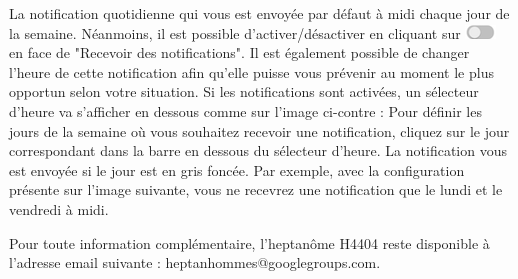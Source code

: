 La notification quotidienne qui vous est envoyée par défaut à midi chaque 
jour de la semaine. Néanmoins, il est possible d'activer/désactiver  en cliquant sur 
\includegraphics{images/onoff.png} en face de "Recevoir des notifications". 
Il est également possible de changer l'heure de cette notification
afin qu'elle puisse vous prévenir au moment le plus opportun selon votre situation. 
Si les notifications sont activées, un sélecteur d'heure va s'afficher en dessous comme 
sur l'image ci-contre : 
Pour définir les jours de la semaine où vous souhaitez recevoir une notification, cliquez sur le jour correspondant dans la barre en dessous du sélecteur d'heure. La notification vous est envoyée si le jour est en gris foncée. Par exemple, avec la configuration présente sur l'image suivante, vous ne recevrez une notification que le lundi et le vendredi à midi. 

Pour toute information complémentaire, l'heptanôme H4404 reste disponible
à l'adresse email suivante : heptanhommes@googlegroups.com. 